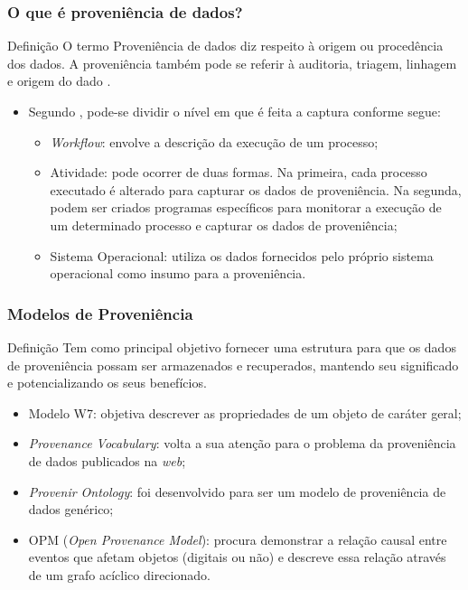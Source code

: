 \documentclass{beamer}
\begin{document}
\begin{frame}
\frametitle{O que \'e proveni\^encia de dados?}
\begin{block}{Defini\c{c}\~ao}
O termo Proveni\^encia de dados diz respeito \`a origem ou
proced\^encia dos dados. A proveni\^encia tamb\'em pode se referir \`a
auditoria, triagem, linhagem e origem do dado \cite{p2}.
\end{block}
\begin{itemize}
\item Segundo \cite{p3}, pode-se dividir o n\'ivel em que \'e feita a
  captura conforme segue:
\begin{itemize}
\item \textit{Workflow}: envolve a descri\c{c}\~ao da execu\c{c}\~ao de um
  processo;
\item Atividade: pode ocorrer de duas formas. Na primeira, cada
  processo executado \'e alterado para capturar os dados de
  proveni\^encia. Na segunda, podem ser criados programas
  espec\'ificos para monitorar a execu\c{c}\~ao de um determinado
  processo e capturar os dados de proveni\^encia;
\item Sistema Operacional: utiliza os dados fornecidos pelo pr\'oprio sistema operacional como insumo para a proveni\^encia.
\end{itemize}
\end{itemize}

\end{frame}


\begin{frame}
\frametitle{Modelos de Proveni\^encia}
\begin{block}{Defini\c{c}\~ao}
Tem como principal objetivo fornecer uma estrutura para que os dados
de proveni\^encia possam ser armazenados e recuperados, mantendo seu significado e potencializando os seus benef\'icios. 
\end{block}
\begin{itemize}
\item Modelo W7: objetiva descrever as propriedades de um objeto de
  car\'ater geral;
\item \textit{Provenance Vocabulary}: volta a sua aten\c{c}\~ao para o
  problema da proveni\^encia de dados publicados na \textit{web};
\item \textit{Provenir Ontology}: foi desenvolvido para ser um modelo
  de proveni\^encia de dados gen\'erico;
\item OPM (\textit{Open Provenance Model}): procura demonstrar a
  rela\c{c}\~ao causal entre eventos que afetam objetos (digitais ou
  n\~ao) e descreve essa rela\c{c}\~ao atrav\'es de um grafo
  ac\'iclico direcionado.
\end{itemize}
\end{frame}
\end{document}

